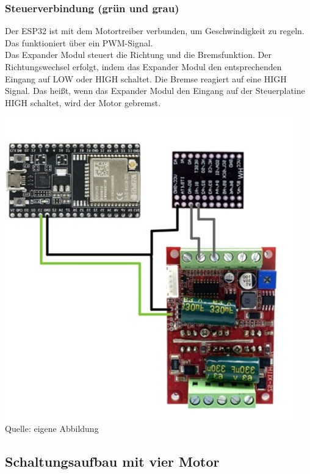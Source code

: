 \documentclass[ngerman,12pt,a4paper]{article}
\begin{document}
			\subsubsection*{Steuerverbindung (grün und grau)}
			
			 Der ESP32 ist mit dem Motortreiber verbunden, um Geschwindigkeit zu regeln. Das funktioniert über ein PWM-Signal. \\[0.5cm]
			 Das Expander Modul steuert die Richtung und die Bremsfunktion. Der Richtungswechsel erfolgt, indem das Expander Modul den entsprechenden Eingang auf LOW oder HIGH schaltet. Die Bremse reagiert auf eine HIGH Signal. Das heißt, wenn das Expander Modul den Eingang auf der Steuerplatine HIGH schaltet, wird der Motor gebremst.
			 \\[0.5cm]
			
			\begin{minipage}{\textwidth}
				\centering
				\includegraphics[scale=1]{Pictures/Steuerverbindung}
				\label{fig:spiffs_init}
				\vspace{-2pt}
				\small Quelle: eigene Abbildung
			\end{minipage}
			
		\subsection{Schaltungsaufbau mit vier Motor} %
			
\end{document}
